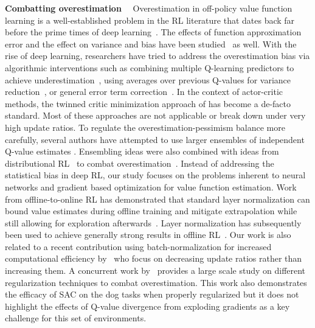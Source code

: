 {\bf Combatting overestimation}~~
Overestimation in off-policy value function learning is a well-established problem in the RL literature that dates back far before the prime times of deep learning~\parencite{thrun1993issues, precup2001off}. The effects of function approximation error and the effect on variance and bias have been studied~\parencite{pendrith1997estimator, mannor2007bias} as well.
With the rise of deep learning, researchers have tried to address the overestimation bias via algorithmic interventions such as combining multiple Q-learning predictors to achieve underestimation~\parencite{hasselt2010double, hasselt2016deep, zongzhang2017weighted, lan2020maxmin}, using averages over previous Q-values for variance reduction~\parencite{anschel2017averaged}, or general error term correction~\parencite{donghun2013bias, fox2016taming}. In the context of actor-critic methods, the twinned critic minimization approach of \textcite{fujimoto2018addressing} has become a de-facto standard. Most of these approaches are not applicable or break down under very high update ratios.
To regulate the overestimation-pessimism balance more carefully, several authors have attempted to use larger ensembles of independent Q-value estimates \parencite{lee2021sunrise,peer2021ensemble,chen2021randomized,hiraoka2022dropout}. Ensembling ideas were also combined with ideas from distributional RL~\parencite{bellemare2017distributional} to combat overestimation~\parencite{kuznetsov2020controlling}.  Instead of addressing the statistical bias in deep RL, our study focuses on the problems inherent to neural networks and gradient based optimization for value function estimation. Work from offline-to-online RL has demonstrated that standard layer normalization can bound value estimates during offline training and mitigate extrapolation while still allowing for exploration afterwards~\parencite{ball2023efficient}. Layer normalization has subsequently been used to achieve generally strong results in offline RL~\parencite{tarasov2023rebrac}. Our work is also related to a recent contribution using batch-normalization for increased computational efficiency by~\textcite{bhatt2024crossq} who focus on decreasing update ratios rather than increasing them. A concurrent work by~\textcite{nauman2024overestimation} provides a large scale study on different regularization techniques to combat overestimation. This work also demonstrates the efficacy of SAC on the dog tasks when properly regularized but it does not highlight the effects of Q-value divergence from exploding gradients as a key challenge for this set of environments.

